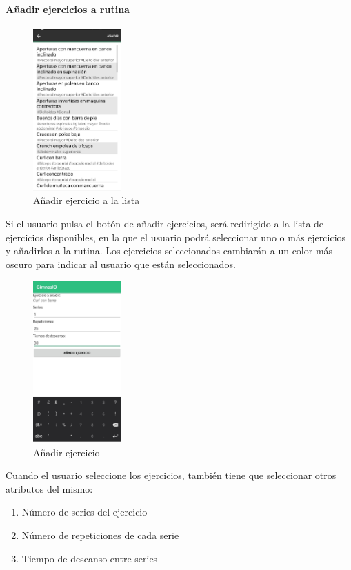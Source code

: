 \documentclass[11pt,a4paper]{report}
\begin{document}
\paragraph{Añadir ejercicios a rutina}
\begin{figure}[H]
	\centering
	\includegraphics[width=0.3\textwidth]{graficos/manual/AnadirEjercicioLista.jpg}
	\caption{Añadir ejercicio a la lista}
\end{figure}
Si el usuario pulsa el botón de añadir ejercicios, será redirigido a la lista de ejercicios disponibles, en la que el usuario podrá seleccionar uno o más ejercicios y añadirlos a la rutina. Los ejercicios seleccionados cambiarán a un color más oscuro para indicar al usuario que están seleccionados.
\begin{figure}[H]
	\centering
	\includegraphics[width=0.3\textwidth]{graficos/manual/AnadirEjercicio.jpg}
	\caption{Añadir ejercicio}
\end{figure}
Cuando el usuario seleccione los ejercicios, también tiene que seleccionar otros atributos del mismo:
\begin{enumerate}
	\item Número de series del ejercicio

	\item Número de repeticiones de cada serie

	\item Tiempo de descanso entre series

\end{enumerate}
\end{document}
